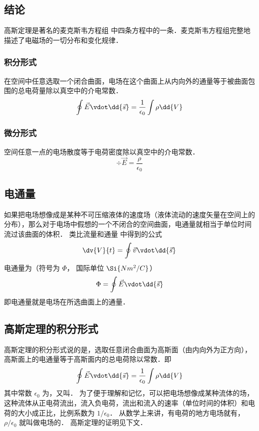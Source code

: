 

\subsection{结论}
高斯定理是著名的麦克斯韦方程组%
中四条方程中的一条．麦克斯韦方程组完整地描述了电磁场的一切分布和变化规律．

\subsubsection{积分形式}
在空间中任意选取一个闭合曲面，电场在这个曲面上从内向外的通量等于被曲面包围的总电荷量除以真空中的介电常数．
\begin{equation}
\oint \vec E \vdot \dd{\vec s} = \frac{1}{\epsilon_0} \int \rho \dd{V}
\end{equation}

\subsubsection{微分形式}
空间任意一点的电场散度等于电荷密度除以真空中的介电常数．
\begin{equation}
\div \vec E = \frac{\rho}{\epsilon_0}
\end{equation}                      

\subsection{电通量}
如果把电场想像成是某种不可压缩液体的速度场（液体流动的速度矢量在空间上的分布），那么对于电场中假想的一个不闭合的空间曲面，电通量就相当于单位时间流过该曲面的体积．
类比流量和通量%
中得到的公式
\begin{equation}
\dv{V}{t} = \oint \vec v \vdot \dd{\vec s}
\end{equation} 
电通量为（符号为 $\Phi $， 国际单位 $\Si{N m^2/C}$）
\begin{equation}
\Phi  = \oint \vec E \vdot \dd{\vec s}
\end{equation} 
即电通量就是电场在所选曲面上的通量．

\subsection{高斯定理的积分形式}

高斯定理的积分形式说的是，选取任意闭合曲面为高斯面（由内向外为正方向），高斯面上的电通量等于高斯面内的总电荷除以常数．即
\begin{equation}\label{EGauss_eq5}
\oint \vec E \vdot \dd{\vec s}  = \frac{1}{\epsilon_0} \int \rho \dd{V}
\end{equation} 
其中常数 $\epsilon_0$ 为，又叫． 为了便于理解和记忆，可以把电场想像成某种流体的场，这种流体从正电荷流出，流入负电荷，流出和流入的速率（单位时间的体积）和电荷的大小成正比，比例系数为 $1/\epsilon_0$． 从数学上来讲，有电荷的地方电场就有， $\rho /\epsilon_0$ 就叫做电场的． 高斯定理的证明见下文．

